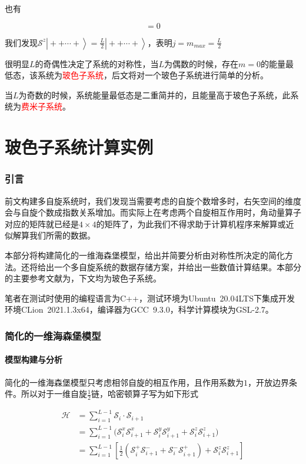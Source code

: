 \documentclass[UTF8,12pt]{article}
\providecommand\Ket[1]{\left|\right. #1 \left.\right\rangle}
\numberwithin{equation}{subsection}
\providecommand{\empR}[1]{\textcolor{red}{#1}}
\providecommand{\sumL}{\sum\limits}
\begin{document}
	也有
	\begin{snugshade}
		\begin{equation}
			[\mathcal S^2,\mathcal S^z]=0
			\label{multiSz}
		\end{equation}
	\end{snugshade}
	
	我们发现$\mathcal S^z\Ket{++\cdots+}=\frac{L}{2}\Ket{++\cdots+}$，表明$j=m_{max}=\frac{L}{2}$
	
	很明显$L$的奇偶性决定了系统的对称性，当$L$为偶数的时候，存在$m=0$的能量最低态，该系统为\empR{玻色子系统}，后文将对一个玻色子系统进行简单的分析。
	
	当$L$为奇数的时候，系统能量最低态是二重简并的，且能量高于玻色子系统，此系统为\empR{费米子系统}。
	\newpage
	\part{玻色子系统计算实例}
	\section{引言}
		前文构建多自旋系统时，我们发现当需要考虑的自旋个数增多时，右矢空间的维度会与自旋个数成指数关系增加。而实际上在考虑两个自旋相互作用时，角动量算子对应的矩阵就已经是$4\times 4$的矩阵了，为此我们不得求助于计算机程序来解算或近似解算我们所需的数据。
		
		本部分将构建简化的一维海森堡模型，给出并简要分析由对称性所决定的简化方法。还将给出一个多自旋系统的数据存储方案，并给出一些数值计算结果。本部分的主要参考文献为\parencite{Bose}，下文均为玻色子系统。
		
		笔者在测试时使用的编程语言为C++，测试环境为Ubuntu~20.04LTS下集成开发环境CLion~2021.1.3x64，编译器为GCC~9.3.0，科学计算模块为GSL-2.7。
		
		\newpage
	\section{简化的一维海森堡模型}
		\subsection{模型构建与分析}
		简化的一维海森堡模型只考虑相邻自旋的相互作用，且作用系数为$1$，开放边界条件。所以对于一维自旋$\frac{1}{2}$链，哈密顿算子写为如下形式
		\begin{snugshade}
			\begin{equation}
				\begin{aligned}
					\mathcal H &= \sumL^{L-1}_{i=1}\mathcal S_i\cdot \mathcal S_{i+1}\\
					&= \sumL^{L-1}_{i=1}\Big(\mathcal S^x_i\mathcal S^x_{i+1}+\mathcal S^y_i\mathcal S^y_{i+1}+\mathcal S^z_i\mathcal S^z_{i+1}\Big)\\
					&= \sumL^{L-1}_{i=1}\left[ \frac{1}{2}(\mathcal S^+_i\mathcal S^-_{i+1}+\mathcal S^-_i\mathcal S^+_{i+1})+\mathcal S^z_i\mathcal S^z_{i+1}\right]
				\end{aligned}
				\label{Hamiltonian}
			\end{equation}
		\end{snugshade}
		
\end{document}

